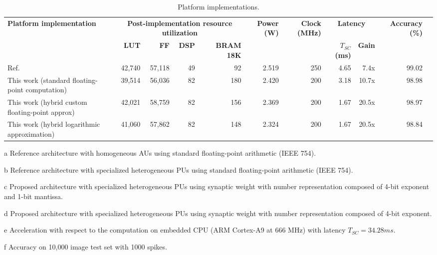 \begin{table}[!t]
	\begin{threeparttable}
		\centering
		\caption{Platform implementations.}\label{tab:platform_comparison}
		\scriptsize
		\begin{tabular}{lrrrrrrrrrr}\toprule
			\multirow{2}{*}{\textbf{Platform implementation}} &\multicolumn{4}{c}{\textbf{Post-implementation resource utilization}} &\multirow{2}{*}{\textbf{Power (W)}} &\multirow{2}{*}{\textbf{Clock (MHz)}} &\multicolumn{2}{c}{\textbf{Latency}} &\multirow{2}{*}{\textbf{Accuracy (\%)\tnote{f}}} \\\cmidrule{2-5}\cmidrule{8-9}
			&\textbf{LUT} &\textbf{FF} &\textbf{DSP} &\textbf{BRAM 18K} & & &$T_{SC}$ \textbf{(ms)} &\textbf{Gain\tnote{e}} & \\\midrule
			Ref. \cite{nevarez2020accelerator}\tnote{a} &42,740 &57,118 &49 &92 &2.519 &250 &4.65 &7.4x &99.02 \\
			This work (standard floating-point computation)\tnote{b} &39,514 &56,036 &82 &180 &2.420 &200 &3.18 &10.7x &98.98 \\
			This work (hybrid custom floating-point approx)\tnote{c} &42,021 &58,759 &82 &156 &2.369 &200 &1.67 &20.5x &98.97 \\
			This work (hybrid logarithmic approximation)\tnote{d} &41,060 &57,862 &82 &148 &2.324 &200 &1.67 &20.5x &98.84 \\
			\bottomrule
		\end{tabular}
		\begin{tablenotes}
			\scriptsize
			\item[a] Reference architecture with homogeneous AUs using standard floating-point arithmetic (IEEE 754).
			\item[b] Reference architecture with specialized heterogeneous PUs using standard floating-point arithmetic (IEEE 754).
			\item[c] Proposed architecture with specialized heterogeneous PUs using synaptic weight with number representation composed of 4-bit exponent and 1-bit mantissa.
			\item[d] Proposed architecture with specialized heterogeneous PUs using synaptic weight with number representation composed of 4-bit exponent.
			\item[e] Acceleration with respect to the computation on embedded CPU (ARM Cortex-A9 at 666 MHz) with latency $T_{SC} = 34.28 ms$.
			\item[f] Accuracy on 10,000 image test set with 1000 spikes.
		\end{tablenotes}
	\end{threeparttable}
\end{table}

